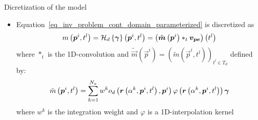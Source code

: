 {%
\begin{block}{Dicretization of the model}
	\begin{itemize}
		\item Equation~\eqref{eq_inv_problem_cont_domain_parameterized} is discretized as
		\begin{align}
		\label{eq_inv_problem_dist_domain_parameterized}
		m\left(\bm{p}^i, t^l\right) = \mathcal{H}_d \left\lbrace \bm{\gamma}\right\rbrace\left(\bm{p}^i, t^l\right) =  \left(\tilde{\bm{m}}\left(\bm{p}^i\right) \ast_t \bm{v_{pe}}\right) \left(t^l\right)
		\end{align}
		where $\ast_t$ is the \num{1}D-convolution and $\tilde{\vec{m}}\left(\vec{p}^i\right) = \left(\tilde{m}\left(\vec{p}^i, t^l\right)\right)_{t^l \in T_d}$ defined by:
		\begin{align}
		\label{eq_m_tilde}
		\tilde{m}\left(\bm{p}^i, t^l\right) = \sum \limits_{k = 1}^{N_x} w^k o_d\left(\bm{r}\left(\alpha^k, \bm{p}^i, t^l\right), \bm{p}^i\right) \varphi \left(\bm{r}\left(\alpha^k, \bm{p}^i, t^l\right)\right) \bm{\gamma}
		\end{align}
		where $w^k$ is the integration weight and $\varphi$ is a \num{1}D-interpolation kernel
	\end{itemize}
\end{block}

}%